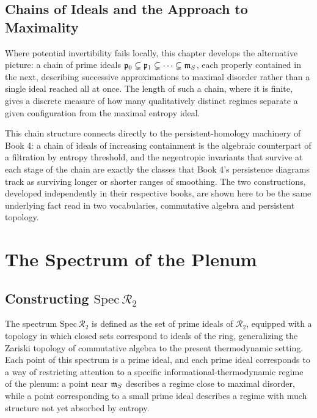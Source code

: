 \chapter{Chains of Ideals and the Approach to Maximality}

Where potential invertibility fails locally, this chapter develops the alternative picture: a chain of prime ideals $\mathfrak{p}_0 \subsetneq \mathfrak{p}_1 \subsetneq \cdots \subsetneq \mathfrak{m}_{S}$, each properly contained in the next, describing successive approximations to maximal disorder rather than a single ideal reached all at once. The length of such a chain, where it is finite, gives a discrete measure of how many qualitatively distinct regimes separate a given configuration from the maximal entropy ideal.

This chain structure connects directly to the persistent-homology machinery of Book 4: a chain of ideals of increasing containment is the algebraic counterpart of a filtration by entropy threshold, and the negentropic invariants that survive at each stage of the chain are exactly the classes that Book 4's persistence diagrams track as surviving longer or shorter ranges of smoothing. The two constructions, developed independently in their respective books, are shown here to be the same underlying fact read in two vocabularies, commutative algebra and persistent topology.

\part{The Spectrum of the Plenum}

\chapter{Constructing $\mathrm{Spec}\,\mathcal{R}_2$}

The spectrum $\mathrm{Spec}\,\mathcal{R}_2$ is defined as the set of prime ideals of $\mathcal{R}_2$, equipped with a topology in which closed sets correspond to ideals of the ring, generalizing the Zariski topology of commutative algebra to the present thermodynamic setting. Each point of this spectrum is a prime ideal, and each prime ideal corresponds to a way of restricting attention to a specific informational-thermodynamic regime of the plenum: a point near $\mathfrak{m}_{S}$ describes a regime close to maximal disorder, while a point corresponding to a small prime ideal describes a regime with much structure not yet absorbed by entropy.

